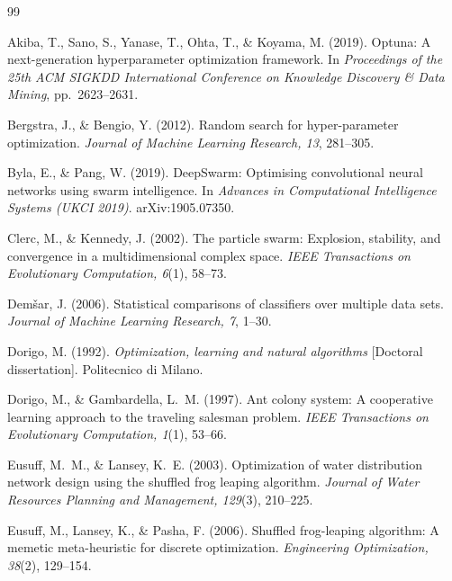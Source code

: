 \documentclass[11pt,a4paper]{article}
\begin{document}
\begin{thebibliography}{99}
\small

Akiba, T., Sano, S., Yanase, T., Ohta, T., \& Koyama, M. (2019).
Optuna: A next-generation hyperparameter optimization framework.
In \emph{Proceedings of the 25th ACM SIGKDD International Conference on Knowledge Discovery \& Data Mining}, pp.~2623--2631.

Bergstra, J., \& Bengio, Y. (2012).
Random search for hyper-parameter optimization.
\emph{Journal of Machine Learning Research, 13}, 281--305.

Byla, E., \& Pang, W. (2019).
DeepSwarm: Optimising convolutional neural networks using swarm intelligence.
In \emph{Advances in Computational Intelligence Systems (UKCI 2019)}. arXiv:1905.07350.

Clerc, M., \& Kennedy, J. (2002).
The particle swarm: Explosion, stability, and convergence in a multidimensional complex space.
\emph{IEEE Transactions on Evolutionary Computation, 6}(1), 58--73.

Dem{\v{s}}ar, J. (2006).
Statistical comparisons of classifiers over multiple data sets.
\emph{Journal of Machine Learning Research, 7}, 1--30.

Dorigo, M. (1992).
\emph{Optimization, learning and natural algorithms} [Doctoral dissertation].
Politecnico di Milano.

Dorigo, M., \& Gambardella, L.~M. (1997).
Ant colony system: A cooperative learning approach to the traveling salesman problem.
\emph{IEEE Transactions on Evolutionary Computation, 1}(1), 53--66.

Eusuff, M.~M., \& Lansey, K.~E. (2003).
Optimization of water distribution network design using the shuffled frog leaping algorithm.
\emph{Journal of Water Resources Planning and Management, 129}(3), 210--225.

Eusuff, M., Lansey, K., \& Pasha, F. (2006).
Shuffled frog-leaping algorithm: A memetic meta-heuristic for discrete optimization.
\emph{Engineering Optimization, 38}(2), 129--154.


\end{thebibliography}
\end{document}
